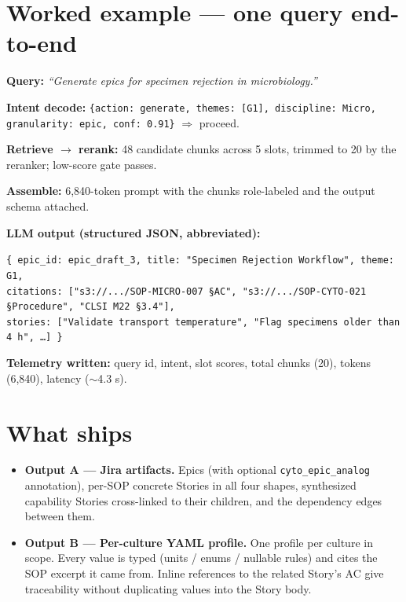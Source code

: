 \documentclass[10.5pt,letterpaper]{article}
\begin{document}
\section{Worked example --- one query end-to-end}

\textbf{Query:} \emph{``Generate epics for specimen rejection in microbiology.''}

\textbf{Intent decode:} \texttt{\{action: generate, themes: [G1], discipline: Micro, granularity: epic, conf: 0.91\}} $\Rightarrow$ proceed.

\textbf{Retrieve $\rightarrow$ rerank:} 48 candidate chunks across 5 slots, trimmed to 20 by the reranker; low-score gate passes.

\textbf{Assemble:} 6{,}840-token prompt with the chunks role-labeled and the output schema attached.

\textbf{LLM output (structured JSON, abbreviated):}

\noindent\texttt{\small \{ epic\_id: epic\_draft\_3, title: "Specimen Rejection Workflow", theme: G1,\\
\hspace*{1em}citations: ["s3://.../SOP-MICRO-007 \S AC", "s3://.../SOP-CYTO-021 \S Procedure", "CLSI M22 \S 3.4"],\\
\hspace*{1em}stories: ["Validate transport temperature", "Flag specimens older than 4 h", \ldots] \}}

\textbf{Telemetry written:} query id, intent, slot scores, total chunks (20), tokens (6{,}840), latency ($\sim$4.3 s).

\section{What ships}

\begin{itemize}
  \item \textbf{Output A --- Jira artifacts.} Epics (with optional \texttt{cyto\_epic\_analog} annotation), per-SOP concrete Stories in all four shapes, synthesized capability Stories cross-linked to their children, and the dependency edges between them.
  \item \textbf{Output B --- Per-culture YAML profile.} One profile per culture in scope. Every value is typed (units / enums / nullable rules) and cites the SOP excerpt it came from. Inline references to the related Story's AC give traceability without duplicating values into the Story body.
\end{itemize}
\end{document}
